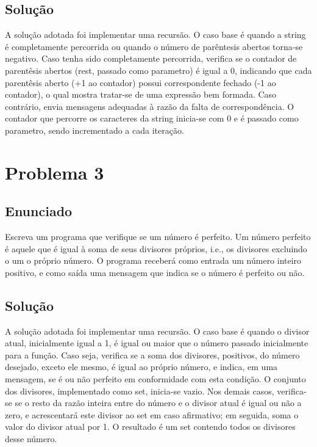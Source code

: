 \documentclass[a4paper, 11pt]{scrartcl}
\begin{document}
\subsection*{Solução}
A solução adotada foi implementar uma recursão. O caso base é quando a string é
completamente percorrida ou quando o número de parêntesis abertos torna-se negativo.
Caso tenha sido completamente percorrida, verifica se o contador de parentêsis 
abertos (rest, passado como parametro) é igual a 0, indicando que cada parentêsis 
aberto (+1 ao contador) possui correspondente  fechado (-1 ao contador), o qual mostra
tratar-se de uma expressão bem formada. Caso contrário, envia mensagens adequadas
à razão da falta de correspondência. O contador que percorre os caracteres da string
inicia-se com 0 e é passado como parametro, sendo incrementado a cada iteração.

\section*{Problema 3}

\subsection*{Enunciado}
Escreva um programa que verifique se um número é perfeito. Um número perfeito é aquele
que é igual à soma de seus divisores próprios, i.e., os divisores excluindo o um o próprio número.
O programa receberá como entrada um número inteiro positivo, e como saída uma mensagem
que indica se o número é perfeito ou não.

\subsection*{Solução}
A solução adotada foi implementar uma recursão. O caso base é quando o divisor atual, 
inicialmente igual a 1, é igual ou maior que o número passado inicialmente para a função. 
Caso seja, verifica se a soma dos divisores, positivos, do número desejado, exceto ele mesmo, é
igual ao próprio número, e indica, em uma mensagem, se é ou não perfeito em conformidade
com esta condição. O conjunto dos divisores, implementado como set, inicia-se 
vazio. Nos demais casos, verifica-se se o resto da razão inteira entre do número e o
divisor atual é igual ou não a zero, e acrescentará este divisor ao set em caso afirmativo;
em seguida, soma o valor do divisor atual por 1. O resultado é um set contendo todos
os divisores desse número.
\end{document}
